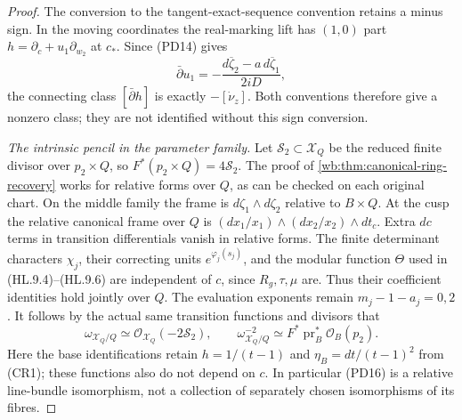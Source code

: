 \begin{proof}
The conversion to the tangent-exact-sequence convention retains a
minus sign. In the moving coordinates the real-marking lift has
$(1,0)$ part $h=\partial_c+u_1\partial_{w_2}$ at $c_*$.
Since (PD14) gives
\[
 \bar\partial u_1=-\frac{d\overline\zeta_2-a\,d\overline\zeta_1}{2iD},
\]
the connecting class $[\bar\partial h]$ is exactly $-[\dot\nu_z]$.
Both conventions therefore give a nonzero class; they are not identified
without this sign conversion.

\emph{The intrinsic pencil in the parameter family.}
Let $\mathcal S_2\subset\mathcal X_Q$ be the reduced finite divisor
over $p_2\times Q$, so $F^*(p_2\times Q)=4\mathcal S_2$.
The proof of \cref{wb:thm:canonical-ring-recovery} works for relative
forms over $Q$, as can be checked on each original chart.
On the middle family the frame is $d\zeta_1\wedge d\zeta_2$ relative
to $B\times Q$. At the cusp the relative canonical frame over $Q$ is
$(dx_1/x_1)\wedge(dx_2/x_2)\wedge dt_c$.
Extra $dc$ terms in transition differentials vanish in relative forms.
The finite determinant characters $\chi_j$, their correcting units
$e^{\varphi_j(s_j)}$, and the modular function $\Theta$ used in
(HL.9.4)--(HL.9.6) are independent of $c$, since $R_g,\tau,\mu$ are.
Thus their coefficient identities hold jointly over $Q$.
The evaluation exponents remain $m_j-1-a_j=0,2$.
It follows by the actual same transition functions and divisors that
\[
 \omega_{\mathcal X_Q/Q}\simeq\mathcal O_{\mathcal X_Q}(-2\mathcal S_2),
 \qquad
 \omega_{\mathcal X_Q/Q}^{-2}\simeq
          F^*\operatorname{pr}_B^*\mathcal O_B(p_2).
 \tag{PD16}
\]
Here the base identifications retain $h=1/(t-1)$ and
$\eta_B=dt/(t-1)^2$ from (CR1); these functions also do not depend on $c$.
In particular (PD16) is a relative line-bundle isomorphism, not a
collection of separately chosen isomorphisms of its fibres.


\end{proof}
